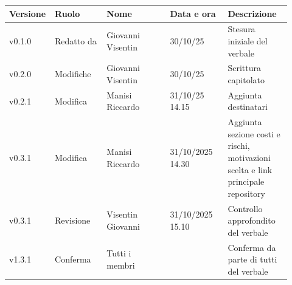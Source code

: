 \documentclass[a4paper,12pt]{article}
\begin{document}
\begin{center}
\small
\renewcommand{\arraystretch}{1.2} 
\begin{tabular}{|p{0.1\linewidth}|p{0.18\linewidth}|p{0.22\linewidth}|p{0.20\linewidth}|p{0.22\linewidth}|}
\hline
\rowcolor{gray!60} 
\textbf{Versione} & \textbf{Ruolo} & \textbf{Nome} & \textbf{Data e ora} & \textbf{Descrizione} \\
\hline
\rowcolor{white}
v0.1.0 & Redatto da & Giovanni Visentin & 30/10/25 & Stesura iniziale del verbale \\
\hline
\rowcolor{gray!20}
v0.2.0 & Modifiche & Giovanni Visentin & 30/10/25 &  Scrittura capitolato\\
\hline
\rowcolor{white}
v0.2.1 & Modifica & Manisi Riccardo & 31/10/25 14.15 & Aggiunta destinatari \\
\hline
\rowcolor{gray!20}
v0.3.1 & Modifica & Manisi Riccardo & 31/10/2025 14.30 & Aggiunta sezione costi e rischi, motivazioni scelta e link principale repository \\
\hline
\rowcolor{white}
v0.3.1 & Revisione & Visentin Giovanni & 31/10/2025 15.10 & Controllo approfondito del verbale \\
\hline
\rowcolor{gray!20}
v1.3.1 & Conferma & Tutti i membri &  & Conferma da parte di tutti del verbale \\
\hline

\end{tabular}
\end{center}
\end{document}

